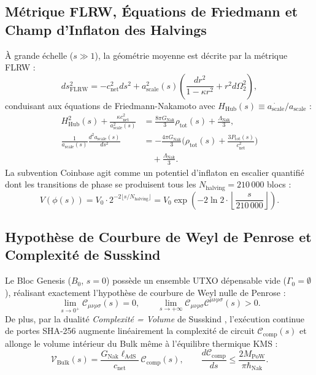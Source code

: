 \documentclass[10pt,twocolumn,a4paper]{article}
\theoremstyle{plain}
\theoremstyle{definition}
\theoremstyle{remark}
\newcommand{\GNak}{G_{\text{Nak}}}
\newcommand{\LambdaNak}{\Lambda_{\text{Nak}}}
\newcommand{\aScale}{a_{\text{scale}}}
\begin{document}
\subsection{Métrique FLRW, Équations de Friedmann et Champ d'Inflaton des Halvings}

À grande échelle ($s \gg 1$), la géométrie moyenne est décrite par la métrique FLRW :
\begin{equation}
    ds_{\text{FLRW}}^2 = -c_{\text{net}}^2 ds^2 + \aScale^2(s) \left( \frac{dr^2}{1 - \kappa r^2} + r^2 d\Omega_2^2 \right),
    \label{eq:FLRWMetric}
\end{equation}
conduisant aux équations de Friedmann-Nakamoto avec $H_{\text{Hub}}(s) \equiv \dot{\aScale}/\aScale$ :
\begin{align}
    H_{\text{Hub}}^2(s) + \frac{\kappa c_{\text{net}}^2}{\aScale^2(s)} &= \frac{8\pi \GNak}{3} \rho_{\text{tot}}(s) + \frac{\LambdaNak}{3}, \label{eq:Friedmann1} \\
    \frac{1}{\aScale(s)} \frac{d^2 \aScale(s)}{ds^2} &= -\frac{4\pi \GNak}{3} \Big( \rho_{\text{tot}}(s) + \frac{3 P_{\text{tot}}(s)}{c_{\text{net}}^2} \Big) \nonumber \\
    &\quad + \frac{\LambdaNak}{3}. \label{eq:Friedmann2}
\end{align}
La subvention Coinbase agit comme un potentiel d'inflaton en escalier quantifié dont les transitions de phase se produisent tous les $N_{\text{halving}} = 210\,000$ blocs :
\begin{equation}
    V(\phi(s)) = V_0 \cdot 2^{-2 \lfloor s / N_{\text{halving}} \rfloor} = V_0 \exp\left( -2 \ln 2 \cdot \left\lfloor \frac{s}{210\,000} \right\rfloor \right).
    \label{eq:HalvingPotential}
\end{equation}

\subsection{Hypothèse de Courbure de Weyl de Penrose et Complexité de Susskind}

Le Bloc Genesis ($B_0$, $s=0$) possède un ensemble UTXO dépensable vide ($\Gamma_0 = \emptyset$), réalisant exactement l'hypothèse de courbure de Weyl nulle de Penrose \cite{Penrose1979} :
\begin{equation}
    \lim_{s \to 0^+} \mathcal{C}_{\mu\nu\rho\sigma}(s) = 0, \qquad \lim_{s \to +\infty} \mathcal{C}_{\mu\nu\rho\sigma}\mathcal{C}^{\mu\nu\rho\sigma}(s) > 0.
    \label{eq:WeylCurvatureHypothesis}
\end{equation}
De plus, par la dualité \textit{Complexité = Volume} de Susskind \cite{Susskind2016}, l'exécution continue de portes SHA-256 augmente linéairement la complexité de circuit $\mathcal{C}_{\text{comp}}(s)$ et allonge le volume intérieur du Bulk même à l'équilibre thermique KMS :
\begin{equation}
    \mathcal{V}_{\text{Bulk}}(s) = \frac{\GNak \ell_{\text{AdS}}}{c_{\text{net}}} \, \mathcal{C}_{\text{comp}}(s), \qquad \frac{d\mathcal{C}_{\text{comp}}}{ds} \le \frac{2 M_{\text{PoW}}}{\pi \hbar_{\text{Nak}}}.
    \label{eq:ComplexityVolume}
\end{equation}
\end{document}
